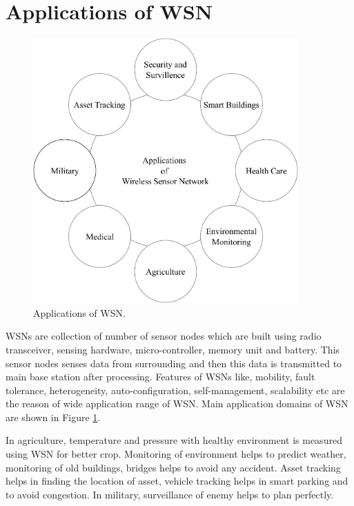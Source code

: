 \section{Applications of WSN}
\begin{figure}[htbp]
\center	
\includegraphics[width=4in, height=4in] {Figures/PDF/WSN-Applications.pdf}	
\caption{Applications of WSN.}
\label{WSN-Applications}	
\end{figure}
WSNs are collection of number of sensor nodes which are built using radio transceiver, sensing hardware, micro-controller, memory unit and battery. This sensor nodes senses data from surrounding and then this data is transmitted to main base station after processing. Features of WSNs like, mobility, fault tolerance, heterogeneity, auto-configuration, self-management, scalability etc are the reason of wide application range of WSN. Main application domains \cite{ramson2017applications} of WSN are shown in Figure \ref{WSN-Applications}. 
\par In agriculture, temperature and pressure with healthy environment is measured using WSN for better crop. Monitoring of environment helps to predict weather, monitoring of old buildings, bridges helps to avoid any accident. Asset tracking helps in finding the location of asset, vehicle tracking  helps in smart parking and to avoid congestion. In military, surveillance of enemy helps to plan perfectly.

